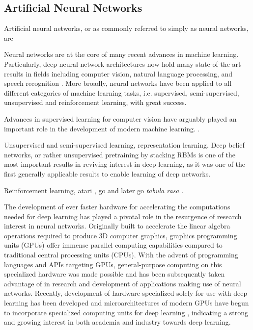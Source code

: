 \subsection{Artificial Neural Networks}
\label{section:artificial_neural_networks}

Artificial neural networks, or as commonly referred to simply as neural networks, are 

Neural networks are at the core of many recent advances in machine learning. Particularly, deep neural network architectures now hold many state-of-the-art results in fields including computer vision, natural language processing, and speech recognition \cite{deep_learning}. More broadly, neural networks have been applied to all different categories of machine learning tasks, i.e. supervised, semi-supervised, unsupervised and reinforcement learning, with great success.

Advances in supervised learning for computer vision have arguably played an important role in the development of modern machine learning. \cite{imagenet}.

Unsupervised and semi-supervised learning, representation learning. Deep belief networks, or rather unsupervised pretraining by stacking RBMs is one of the most important results in reviving interest in deep learning, as it was one of the first generally applicable results to enable learning of deep networks. 

Reinforcement learning, atari \cite{deep_atari}, go \cite{alphago} and later go \textit{tabula rasa} \cite{alphazero}.

The development of ever faster hardware for accelerating the computations needed for deep learning has played a pivotal role in the resurgence of research interest in neural networks. Originally built to accelerate the linear algebra operations required to produce 3D computer graphics, graphics programming units (GPUs) offer immense parallel computing capabilities compared to traditional central processing units (CPUs). With the advent of programming languages and APIs targeting GPUs, general-purpose computing on this specialized hardware was made possible and has been subsequently taken advantage of in research and development of applications making use of neural networks. Recently, development of hardware specialized solely for use with deep learning has been developed \cite{tpu} and microarchitectures of modern GPUs have begun to incorporate specialized computing units for deep learning \cite{nvidia_tensor_core}, indicating a strong and growing interest in both academia and industry towards deep learning.

